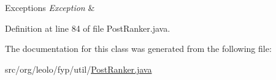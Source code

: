 \begin{DoxyExceptions}{Exceptions}
{\em Exception} & \\
\hline
\end{DoxyExceptions}


Definition at line 84 of file Post\-Ranker.\-java.



The documentation for this class was generated from the following file\-:\begin{DoxyCompactItemize}
\item 
src/org/leolo/fyp/util/\hyperlink{_post_ranker_8java}{Post\-Ranker.\-java}\end{DoxyCompactItemize}
